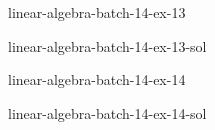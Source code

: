 \documentclass[preview]{standalone}
\begin{document}
\begin{snippetexercise}{linear-algebra-batch-14-ex-13}{}
    \todo
\end{snippetexercise}

\begin{snippetsolution}{linear-algebra-batch-14-ex-13-sol}{}
    \todo
\end{snippetsolution}

\begin{snippetexercise}{linear-algebra-batch-14-ex-14}{}
    \todo
\end{snippetexercise}

\begin{snippetsolution}{linear-algebra-batch-14-ex-14-sol}{}
    \todo
\end{snippetsolution}
\end{document}

